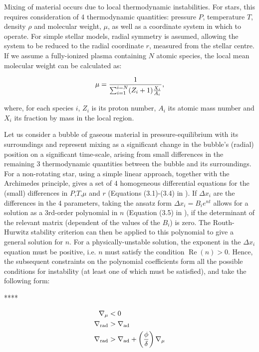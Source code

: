 \documentclass[12pt, a4paper]{report}
\begin{document}
Mixing of material occurs due to local thermodynamic instabilities. For stars, this requires consideration of 4 thermodynamic quantities: pressure $P$, temperature $T$, density $\rho$ and molecular weight, $\mu$, as well as a coordinate system in which to operate. For simple stellar models, radial symmetry is assumed, allowing the system to be reduced to the radial coordinate $r$, measured from the stellar centre. If we assume a fully-ionized plasma containing $N$ atomic species, the local mean molecular weight can be calculated as:

\begin{equation}
\mu = \frac{1}{\sum_{i=1}^{i=N} (Z_{i}+1) \frac{X_{i}}{A_{i}}} \textnormal{,}
\label{mol_weight_def}
\end{equation}

where, for each species $i$, $Z_{i}$ is its proton number, $A_{i}$ its atomic mass number and $X_{i}$ its fraction by mass in the local region.

Let us consider a bubble of gaseous material in pressure-equilibrium with its surroundings and represent mixing as a significant change in the bubble's (radial) position on a significant time-scale, arising from small differences in the remaining 3 thermodynamic quantities between the bubble and its surroundings. For a non-rotating star, using a simple linear approach, together with the Archimedes principle, gives a set of 4 homogeneous differential equations for the (small) differences in $P$,$T$,$\mu$ and $r$ (Equations (3.1)-(3.4) in \cite{2017RSOS....470192S}). If $\Delta x_{i}$ are the differences in the 4 parameters, taking the ansatz form $\Delta x_{i} = B_{i} e^{nt}$ allows for a solution as a 3rd-order polynomial in $n$ (Equation (3.5) in \cite{2017RSOS....470192S}), if the determinant of the relevant matrix (dependent of the values of the $B_{i}$) is zero. The Routh-Hurwitz stability criterion can then be applied to this polynomial to give a general solution for $n$. For a physically-unstable solution, the exponent in the $\Delta x_{i}$ equation must be positive, i.e. $n$ must satisfy the condition $\operatorname{Re}(n) > 0$. Hence, the subsequent constraints on the polynomial coefficients form all the possible conditions for instability (at least one of which must be satisfied), and take the following form:

**** \cite{2017Galax...5...28O}

\begin{align}
\nabla _{\mu} &< 0 \label{mu_inv_ineq} \\
\nabla _{\textnormal{rad}} &> \nabla _{\textnormal{ad}} \label{schwarz_ineq} \\
\nabla _{\textnormal{rad}} &> \nabla _{\textnormal{ad}} + \left( \frac{\phi}{\delta} \right) \nabla _{\mu} \label{ledoux_ineq}
\end{align}
\end{document}
